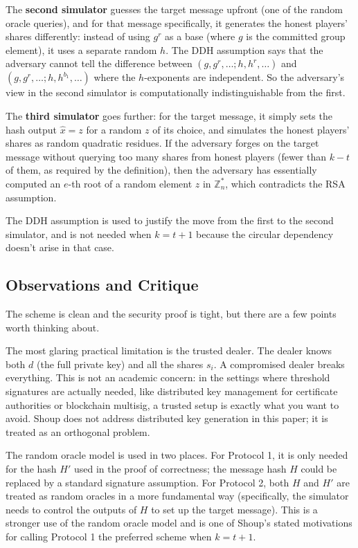 The \textbf{second simulator} guesses the target message upfront (one of the random
oracle queries), and for that message specifically, it generates the honest players'
shares differently: instead of using $g^r$ as a base (where $g$ is the committed
group element), it uses a separate random $h$. The DDH assumption says that the
adversary cannot tell the difference between $(g, g^r, \ldots; h, h^r, \ldots)$ and
$(g, g^r, \ldots; h, h^{b_1}, \ldots)$ where the $h$-exponents are independent. So the
adversary's view in the second simulator is computationally indistinguishable from the
first.

The \textbf{third simulator} goes further: for the target message, it simply sets the
hash output $\hat{x} = z$ for a random $z$ of its choice, and simulates the honest
players' shares as random quadratic residues. If the adversary forges on the target
message without querying too many shares from honest players (fewer than $k - t$ of
them, as required by the definition), then the adversary has essentially computed an
$e$-th root of a random element $z$ in $\mathbb{Z}_n^*$, which contradicts the RSA
assumption.

The DDH assumption is used to justify the move from the first to the second simulator,
and is not needed when $k = t + 1$ because the circular dependency doesn't arise in
that case.

\subsection{Observations and Critique}

The scheme is clean and the security proof is tight, but there are a few points worth
thinking about.

The most glaring practical limitation is the trusted dealer. The dealer knows both $d$
(the full private key) and all the shares $s_i$. A compromised dealer breaks everything.
This is not an academic concern: in the settings where threshold signatures are actually
needed, like distributed key management for certificate authorities or blockchain
multisig, a trusted setup is exactly what you want to avoid. Shoup does not address
distributed key generation in this paper; it is treated as an orthogonal problem.

The random oracle model is used in two places. For Protocol 1, it is only needed for the
hash $H'$ used in the proof of correctness; the message hash $H$ could be replaced by a
standard signature assumption. For Protocol 2, both $H$ and $H'$ are treated as random
oracles in a more fundamental way (specifically, the simulator needs to control the
outputs of $H$ to set up the target message). This is a stronger use of the random oracle
model and is one of Shoup's stated motivations for calling Protocol 1 the preferred scheme
when $k = t + 1$.

